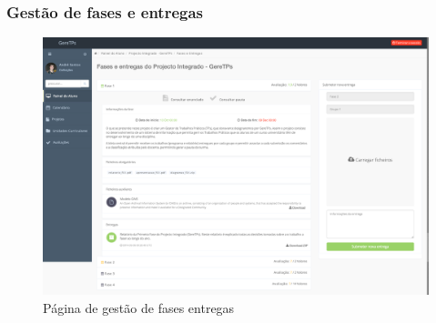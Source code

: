 \subsubsection{Gestão de fases e entregas}

\begin{figure}[H]
  \centering
  \includegraphics[width=1\textwidth,center]{images/implementacao/alunos/deliveries}
  \caption{Página de gestão de fases entregas}
  \label{fig:student_deliveries}
\end{figure}
